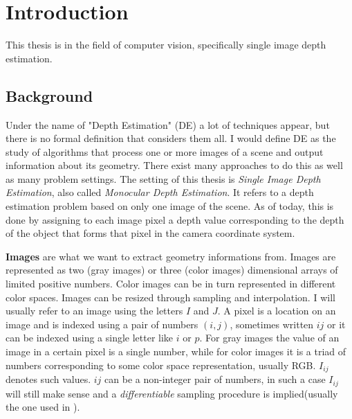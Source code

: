 \chapter{Introduction}
\label{ch:intro}

This thesis is in the field of computer vision, specifically single image depth estimation.

\section{Background}
Under the name of "Depth Estimation" (DE) a lot of techniques appear, but there is no formal definition that considers them all.
I would define DE as the study of algorithms that process one or more images of a scene and output information about its geometry.
There exist many approaches to do this as well as many problem settings.
The setting of this thesis is \textit{Single Image Depth Estimation}, also called \textit{Monocular Depth Estimation}.
It refers to a depth estimation problem based on only one image of the scene.
As of today, this is done by assigning to each image pixel a depth value corresponding to the depth of the object that forms that pixel in the camera coordinate system.

\textbf{Images} are what we want to extract geometry informations from.
Images are represented as two (gray images) or three (color images) dimensional arrays of limited positive numbers.
Color images can be in turn represented in different color spaces.
Images can be resized through sampling and interpolation.
I will usually refer to an image using the letters $I$ and $J$.
A pixel is a location on an image and is indexed using a pair of numbers $(i, j)$, sometimes written $ij$ or it can be indexed using a single letter like $i$ or $p$.
For gray images the value of an image in a certain pixel is a single number, while for color images it is a triad of numbers corresponding to some color space representation, usually RGB.
$I_{ij}$ denotes such values.
$ij$ can be a non-integer pair of numbers, in such a case $I_{ij}$ will still make sense and a \textit{differentiable} sampling procedure is implied(usually the one used in \cite{STN}).


